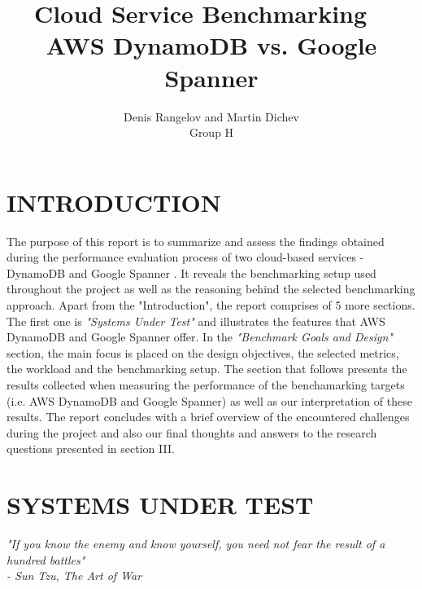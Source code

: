 \documentclass[letterpaper, 10 pt, conference]{ieeeconf}  %
\title{\huge \textbf{Cloud Service Benchmarking} 
\hfill \ \\
\LARGE{AWS DynamoDB vs. Google Spanner}
}
\author{Denis Rangelov and Martin Dichev
\\
Group H}
\begin{document}
\maketitle
\thispagestyle{empty}
\pagestyle{empty}

\section{INTRODUCTION}
The purpose of this report is to summarize and assess the findings obtained during the performance evaluation process of two cloud-based services - DynamoDB \cite{DynamoWebPage} and Google Spanner \cite{SpannerWebPage}. It reveals the benchmarking setup used throughout the project as well as the reasoning behind the selected benchmarking approach. Apart from the "Introduction", the report comprises of 5 more sections. The first one is \textit{"Systems Under Test"} and illustrates the features that AWS DynamoDB and Google Spanner offer. In the \textit{"Benchmark Goals and Design"} section, the main focus is placed on the design objectives, the selected metrics, the workload and the benchmarking setup. The section that follows presents the results collected when measuring the performance of the benchamarking targets (i.e. AWS DynamoDB and Google Spanner) as well as our interpretation of these results. The report concludes with a brief overview of the encountered challenges during the project and also our final thoughts and answers to the research questions presented in section III.





\section{SYSTEMS UNDER TEST}
\begin{center}
    \textit{"If you know the enemy and know yourself, you need not fear the result of a hundred battles" \\ 
    - Sun Tzu, The Art of War   }
\end{center}
\end{document}

